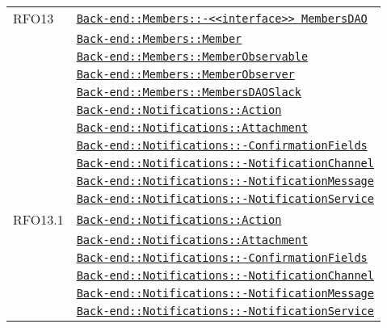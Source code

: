 \begin{longtable}{|>{\centering}m{3cm}|m{10cm}<{\centering}|}
RFO13 & \hyperref[Back-end::Members::<<interface>> MembersDAO]{\texttt{Back-end::Members::-\linebreak <<interface>> MembersDAO}}\\
& \hyperref[Back-end::Members::Member]{\texttt{Back-end::Members::Member}}\\
& \hyperref[Back-end::Members::MemberObservable]{\texttt{Back-end::Members::MemberObservable}}\\
& \hyperref[Back-end::Members::MemberObserver]{\texttt{Back-end::Members::MemberObserver}}\\
& \hyperref[Back-end::Members::MembersDAOSlack]{\texttt{Back-end::Members::MembersDAOSlack}}\\
& \hyperref[Back-end::Notifications::Action]{\texttt{Back-end::Notifications::Action}}\\
& \hyperref[Back-end::Notifications::Attachment]{\texttt{Back-end::Notifications::Attachment}}\\
& \hyperref[Back-end::Notifications::ConfirmationFields]{\texttt{Back-end::Notifications::-\linebreak ConfirmationFields}}\\
& \hyperref[Back-end::Notifications::NotificationChannel]{\texttt{Back-end::Notifications::-\linebreak NotificationChannel}}\\
& \hyperref[Back-end::Notifications::NotificationMessage]{\texttt{Back-end::Notifications::-\linebreak NotificationMessage}}\\
& \hyperref[Back-end::Notifications::NotificationService]{\texttt{Back-end::Notifications::-\linebreak NotificationService}}\\ \hline

RFO13.1 & \hyperref[Back-end::Notifications::Action]{\texttt{Back-end::Notifications::Action}}\\
& \hyperref[Back-end::Notifications::Attachment]{\texttt{Back-end::Notifications::Attachment}}\\
& \hyperref[Back-end::Notifications::ConfirmationFields]{\texttt{Back-end::Notifications::-\linebreak ConfirmationFields}}\\
& \hyperref[Back-end::Notifications::NotificationChannel]{\texttt{Back-end::Notifications::-\linebreak NotificationChannel}}\\
& \hyperref[Back-end::Notifications::NotificationMessage]{\texttt{Back-end::Notifications::-\linebreak NotificationMessage}}\\
& \hyperref[Back-end::Notifications::NotificationService]{\texttt{Back-end::Notifications::-\linebreak NotificationService}}\\ \hline


\end{longtable}
